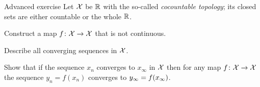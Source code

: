 \begin{thm}{Advanced exercise}\label{ex:cocountable-top}
Let $\mathcal{X}$ be $\mathbb{R}$ with the so-called \emph{cocountable topology};
its closed sets are either countable or the whole $\mathbb{R}$.

\begin{subthm}{}
 Construct a map $f\colon\mathcal{X}\to \mathcal{X}$ that is not continuous.
\end{subthm}

\begin{subthm}{}
 Describe all converging sequences in $\mathcal{X}$.
\end{subthm}

\begin{subthm}{}
 Show that if the sequence $x_n$ converges to $x_\infty$ in $\mathcal{X}$ then for any map $f\colon\mathcal{X}\to \mathcal{X}$ the sequence $y_n=f(x_n)$ converges to $y_\infty\z=f(x_\infty)$.
\end{subthm}

\end{thm}
